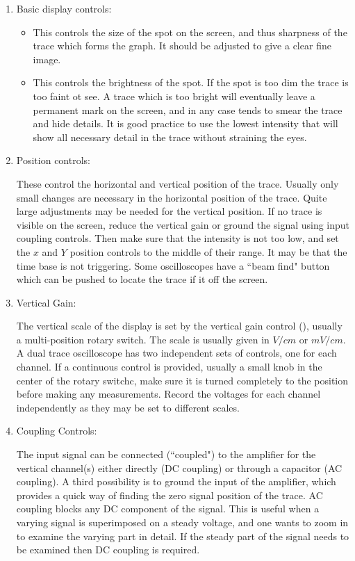 \begin{enumerate}
    \item Basic display controls: \begin{itemize}
            \item {} This controls the size of the spot on the screen, and thus sharpness of the trace which forms the graph. It should be adjusted to give a clear fine image.
            \item {} This controls the brightness of the spot. If the spot is too dim the trace is too faint ot see. A trace which is too bright will eventually leave a permanent mark on the screen, and in any case tends to smear the trace and hide details. It is good practice to use the lowest intensity that will show all necessary detail in the trace without straining the eyes.
    \end{itemize}
    \item Position controls:
        
        These control the horizontal and vertical position of the trace. Usually only small changes are necessary in the horizontal position of the trace. Quite large adjustments may be needed for the vertical position. If no trace is visible on the screen, reduce the vertical gain or ground the signal using input coupling controls. Then make sure that the intensity is not too low, and set the $x$ and $Y$ position controls to the middle of their range. It may be that the time base is not triggering. Some oscilloscopes have a ``beam find" button which can be pushed to locate the trace if it off the screen.
    \item Vertical Gain:

        The vertical scale of the display is set by the vertical gain control (), usually a multi-position rotary switch. The scale is usually given in $V/cm$ or $mV/cm$. A dual trace oscilloscope has two independent sets of controls, one for each channel. If a continuous control is provided, usually a small knob in the center of the rotary switchc, make sure it is turned completely to the  position before making any measurements. Record the voltages for each channel independently as they may be set to different scales.

    \item Coupling Controls:

        The input signal can be connected (``coupled") to the amplifier for the vertical channel(s) either directly (DC coupling) or through a capacitor (AC coupling). A third possibility is to ground the input of the amplifier, which provides a quick way of finding the zero signal position of the trace. AC coupling blocks any DC component of the signal. This is useful when a varying signal is superimposed on a steady voltage, and one wants to zoom in to examine the varying part in detail. If the steady part of the signal needs to be examined then DC coupling is required.


\end{enumerate}
